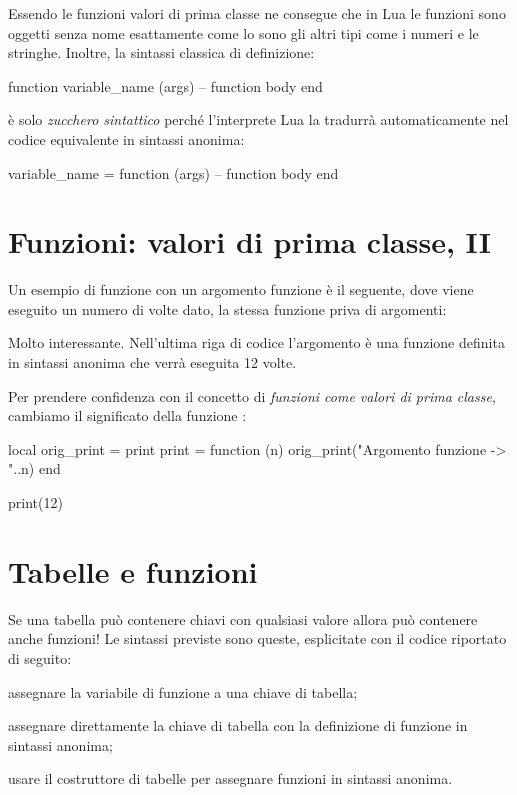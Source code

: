 Essendo le funzioni valori di prima classe ne consegue che in Lua le funzioni
sono oggetti senza nome esattamente come lo sono gli altri tipi come i numeri e
le stringhe. Inoltre, la sintassi classica di definizione:
\begin{lines}
function variable_name (args)
    -- function body
end
\end{lines}

\noindent è solo \emph{zucchero sintattico} perché l'interprete Lua la tradurrà
automaticamente nel codice equivalente in sintassi anonima:
\begin{lines}
variable_name = function (args)
    -- function body
end
\end{lines}


\section{Funzioni: valori di prima classe, II}

Un esempio di funzione con un argomento funzione è il seguente, dove viene
eseguito un numero di volte dato, la stessa funzione priva di argomenti:

Molto interessante. Nell'ultima riga di codice l'argomento è una funzione
definita in sintassi anonima che verrà eseguita 12 volte.

Per prendere confidenza con il concetto di \emph{funzioni come valori di prima
classe}, cambiamo il significato della funzione :
\begin{lines}
local orig_print = print
print = function (n)
    orig_print("Argomento funzione -> "..n)
end

print(12)
\end{lines}


\section{Tabelle e funzioni}

Se una tabella può contenere chiavi con qualsiasi valore allora può contenere
anche funzioni! Le sintassi previste sono queste, esplicitate con il codice
riportato di seguito:
\begin{compactitemize}
\item assegnare la variabile di funzione a una chiave di tabella;
\item assegnare direttamente la chiave di tabella con la definizione di funzione
in sintassi anonima;
\item usare il costruttore di tabelle per assegnare funzioni in sintassi
anonima.
\end{compactitemize}

